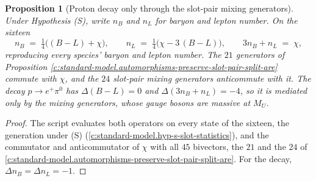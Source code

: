 \documentclass[11pt]{article}
\newtheorem{proposition}[theorem]{Proposition}
\theoremstyle{definition}
\theoremstyle{plain}
\newcommand{\changedmark}[2]{\marginpar{\raggedright\scriptsize\color{#1}#2}}
\begin{document}
\begin{proposition}[Proton decay only through the slot-pair mixing generators]\label{c:standard-model.proton-decay-only-through-slot-pair}
\changedmark{gray}{reworded}
Under Hypothesis (S), write $n_{B}$ and $n_{L}$ for baryon and lepton number. On the sixteen
\[
n_{B} \;=\; \tfrac14\bigl((B - L) + \chi\bigr), \qquad n_{L} \;=\; \tfrac14\bigl(\chi - 3\,(B - L)\bigr), \qquad 3n_{B} + n_{L} \;=\; \chi,
\]
reproducing every species' baryon and lepton number. The $21$ generators of Proposition \ref{c:standard-model.automorphisms-preserve-slot-pair-split-are} commute with $\chi$, and the $24$ slot-pair mixing generators anticommute with it. The decay $p \to e^{+}\pi^{0}$ has $\Delta(B - L) = 0$ and $\Delta(3n_{B} + n_{L}) = -4$, so it is mediated only by the mixing generators, whose gauge bosons are massive at $M_{U}$.
\end{proposition}
\begin{proof}
The script evaluates both operators on every state of the sixteen, the generation under (S) (\ref{c:standard-model.hyp-s-slot-statistics}), and the commutator and anticommutator of $\chi$ with all $45$ bivectors, the $21$ and the $24$ of \ref{c:standard-model.automorphisms-preserve-slot-pair-split-are}. For the decay, $\Delta n_{B} = \Delta n_{L} = -1$.

\end{proof}
\end{document}
